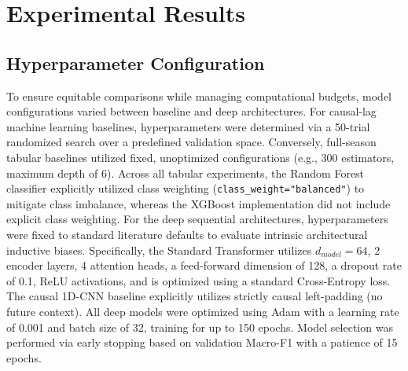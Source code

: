 \documentclass[runningheads]{llncs}
\begin{document}
\begin{table}[h!]
\centering
\caption{EOS prediction coverage averaged across 10 seeds on the 234 eligible test seasons.}
\label{tab:eos_coverage}
\end{table}

\section{Experimental Results}
\subsection{Hyperparameter Configuration}
To ensure equitable comparisons while managing computational budgets, model configurations varied between baseline and deep architectures. For causal-lag machine learning baselines, hyperparameters were determined via a 50-trial randomized search over a predefined validation space. Conversely, full-season tabular baselines utilized fixed, unoptimized configurations (e.g., 300 estimators, maximum depth of 6). Across all tabular experiments, the Random Forest classifier explicitly utilized class weighting (\texttt{class\_weight="balanced"}) to mitigate class imbalance, whereas the XGBoost implementation did not include explicit class weighting. For the deep sequential architectures, hyperparameters were fixed to standard literature defaults to evaluate intrinsic architectural inductive biases. Specifically, the Standard Transformer utilizes $d_{model}=64$, 2 encoder layers, 4 attention heads, a feed-forward dimension of 128, a dropout rate of 0.1, ReLU activations, and is optimized using a standard Cross-Entropy loss. The causal 1D-CNN baseline explicitly utilizes strictly causal left-padding (no future context). All deep models were optimized using Adam with a learning rate of 0.001 and batch size of 32, training for up to 150 epochs. Model selection was performed via early stopping based on validation Macro-F1 with a patience of 15 epochs.
\end{document}
